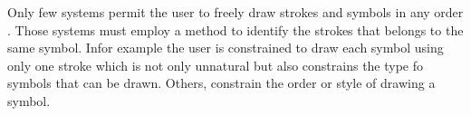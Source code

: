  Only few systems permit the user to freely draw strokes and symbols in any order \cite{Vibratory8,visualpattern43,Cali63,statisticalparsing26,physicalmeaning6}. Those systems must employ a method to identify the strokes that belongs to the same symbol. In\cite{gestureexample12,aideddesgin22,sketchinginterfaces2,sketchinginterfaces2,cognitivesketch18,ewhitboard9}for example the user is constrained to draw each symbol using only one stroke which is not only unnatural but also constrains the type fo symbols that can be drawn. Others, constrain the order or style of drawing a symbol\cite{}.  
 


 
 
 



